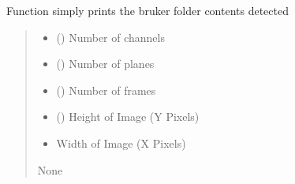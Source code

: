 \documentclass[letterpaper,10pt,english]{sphinxmanual}
\begin{document}
\begin{fulllineitems}
\label{\detokenize{CalSciPy.io:CalSciPy.io.pretty_print_bruker_command}}
\pysigstartsignatures
{}
\pysigstopsignatures
\sphinxAtStartPar
Function simply prints the bruker folder contents detected
\begin{quote}\begin{description}
\begin{itemize}
\item {} 
\sphinxAtStartPar
{} () \sphinxhyphen{}\sphinxhyphen{} Number of channels

\item {} 
\sphinxAtStartPar
{} () \sphinxhyphen{}\sphinxhyphen{} Number of planes

\item {} 
\sphinxAtStartPar
{} () \sphinxhyphen{}\sphinxhyphen{} Number of frames

\item {} 
\sphinxAtStartPar
{} () \sphinxhyphen{}\sphinxhyphen{} Height of Image (Y Pixels)

\item {} 
\sphinxAtStartPar
{} \sphinxhyphen{}\sphinxhyphen{} Width of Image (X Pixels)

\end{itemize}

\sphinxAtStartPar
None

\end{description}\end{quote}

\end{fulllineitems}

\end{document}

